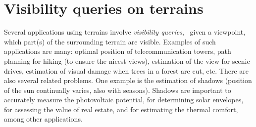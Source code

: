 
\setchapterpreamble[u]{\margintoc}

\chapter{Visibility queries on terrains}
\label{chap:visibility}

\graphicspath{{visibility/}}




Several applications using terrains involve \emph{visibility queries}, \ie\ given a viewpoint, which part(s) of the surrounding terrain are visible.
Examples of such applications are many: optimal position of telecommunication towers, path planning for hiking (to ensure the nicest views), estimation of the view for scenic drives, estimation of visual damage when trees in a forest are cut, etc.
There are also several related problems.
One example is the estimation of shadows (position of the sun continually varies, also with seasons).
Shadows are important to accurately measure the photovoltaic potential, for determining solar envelopes, for assessing the value of real estate, and for estimating the thermal comfort, among other applications.

%

